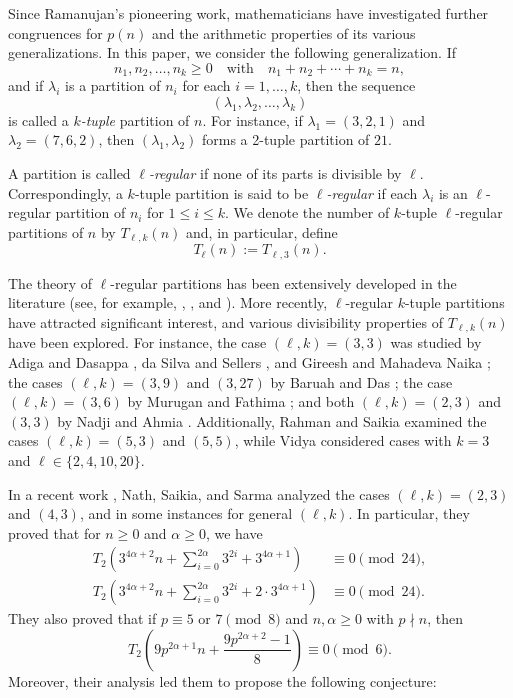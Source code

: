 \documentclass{amsart}
\theoremstyle{definition}
\begin{document}
Since Ramanujan’s pioneering work, mathematicians have investigated further congruences for $p(n)$ and the arithmetic properties of its various generalizations. In this paper, we consider the following generalization. If
\[
n_1, n_2, \dots, n_k \ge 0 \quad \text{with} \quad n_1 + n_2 + \cdots + n_k = n,
\]
and if $\lambda_i$ is a partition of $n_i$ for each $i=1,\dots,k$, then the sequence
\[
(\lambda_1, \lambda_2, \dots, \lambda_k)
\]
is called a \textit{$k$-tuple} partition of $n$. For instance, if $\lambda_1 = (3,2,1)$ and $\lambda_2 = (7,6,2)$, then $(\lambda_1, \lambda_2)$ forms a 2-tuple partition of $21$.  

A partition is called \textit{$\ell$-regular} if none of its parts is divisible by $\ell$. Correspondingly, a $k$-tuple partition is said to be \textit{$\ell$-regular} if each $\lambda_i$ is an $\ell$-regular partition of $n_i$ for $1 \le i \le k$. We denote the number of $k$-tuple $\ell$-regular partitions of $n$ by $T_{\ell,k}(n)$ and, in particular, define
\[
T_\ell(n) := T_{\ell,3}(n).
\]

The theory of $\ell$-regular partitions has been extensively developed in the literature (see, for example, \cite{Furcy-Penniston}, \cite{Gordon-Ono}, and \cite{Hirschhorn-Sellers}). More recently, $\ell$-regular $k$-tuple partitions have attracted significant interest, and various divisibility properties of $T_{\ell,k}(n)$ have been explored.  For instance, the case $(\ell,k)=(3,3)$ was studied by Adiga and Dasappa \cite{Adiga-Dasappa}, da Silva and Sellers \cite{daSilva-Sellers}, and Gireesh and Mahadeva Naika \cite{Gireesh-Mahadeva_Naika}; the cases $(\ell,k)=(3,9)$ and $(3,27)$ by Baruah and Das \cite{Baruah-Das}; the case $(\ell,k)=(3,6)$ by Murugan and Fathima \cite{Murugan-Fathima}; and both $(\ell,k)=(2,3)$ and $(3,3)$ by Nadji and Ahmia \cite{Nadji-Ahmia}. Additionally, Rahman and Saikia \cite{Rahman-Saikia} examined the cases $(\ell,k)=(5,3)$ and $(5,5)$, while Vidya \cite{Vidya} considered cases with $k=3$ and $\ell\in \{2,4,10,20\}$.

In a recent work \cite{Nath-Saikia-Sarma}, Nath, Saikia, and Sarma analyzed the cases $(\ell,k)=(2,3)$ and $(4,3)$, and in some instances for general $(\ell,k)$. 
In particular, they proved  
\cite[Theorem 1.3]{Nath-Saikia-Sarma} that for $n\geq 0$ and $\alpha\geq 0$, we have
 \begin{align}     
\label{TT29n24}T_{2}\left(3^{4\alpha+2}n+\sum_{i=0}^{2\alpha}3^{2i}+3^{4\alpha+1}\right)&\equiv 0\pmod{24}, \\
\label{TTT29n24}T_{2}\left(3^{4\alpha+2}n+\sum_{i=0}^{2\alpha}3^{2i}+2\cdot 3^{4\alpha+1}\right)&\equiv 0\pmod{24}.
 \end{align}
They also proved \cite[Theorem 1.6]{Nath-Saikia-Sarma} that if $p\equiv 5 \text{ or } 7\pmod{8}$ and $n,\alpha\geq0$ with $p\nmid n$, then
\begin{equation}\label{1.6mod6}
T_2\left(9p^{2\alpha+1}n+\frac{9p^{2\alpha+2}-1}{8}\right)\equiv0\pmod{6}.\end{equation}
Moreover, their analysis led them to propose the following conjecture: 
\end{document}
